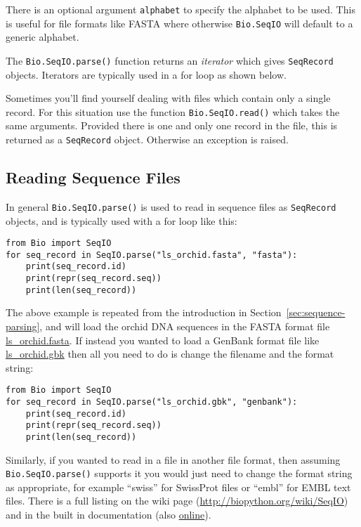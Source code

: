\noindent There is an optional argument \verb|alphabet| to specify the alphabet to be used.  This is useful for file formats like FASTA where otherwise \verb|Bio.SeqIO| will default to a generic alphabet.

The \verb|Bio.SeqIO.parse()| function returns an {\it iterator} which gives \verb|SeqRecord| objects.  Iterators are typically used in a for loop as shown below.

Sometimes you'll find yourself dealing with files which contain only a single record.  For this situation use the function \verb|Bio.SeqIO.read()| which takes the same arguments.  Provided there is one and only one record in the file, this is returned as a \verb|SeqRecord| object.  Otherwise an exception is raised.

\subsection{Reading Sequence Files}

In general \verb|Bio.SeqIO.parse()| is used to read in sequence files as \verb|SeqRecord| objects, and is typically used with a for loop like this:

\begin{verbatim}
from Bio import SeqIO
for seq_record in SeqIO.parse("ls_orchid.fasta", "fasta"):
    print(seq_record.id)
    print(repr(seq_record.seq))
    print(len(seq_record))
\end{verbatim}

The above example is repeated from the introduction in Section~\ref{sec:sequence-parsing}, and will load the orchid DNA sequences in the FASTA format file \href{https://raw.githubusercontent.com/biopython/biopython/master/Doc/examples/ls_orchid.fasta}{ls\_orchid.fasta}.  If instead you wanted to load a GenBank format file like \href{https://raw.githubusercontent.com/biopython/biopython/master/Doc/examples/ls_orchid.gbk}{ls\_orchid.gbk} then all you need to do is change the filename and the format string:

\begin{verbatim}
from Bio import SeqIO
for seq_record in SeqIO.parse("ls_orchid.gbk", "genbank"):
    print(seq_record.id)
    print(repr(seq_record.seq))
    print(len(seq_record))
\end{verbatim}

Similarly, if you wanted to read in a file in another file format, then assuming \verb|Bio.SeqIO.parse()| supports it you would just need to change the format string as appropriate, for example ``swiss'' for SwissProt files or ``embl'' for EMBL text files. There is a full listing on the wiki page (\url{http://biopython.org/wiki/SeqIO}) and in the built in documentation (also \href{http://biopython.org/DIST/docs/api/Bio.SeqIO-module.html}{online}).

